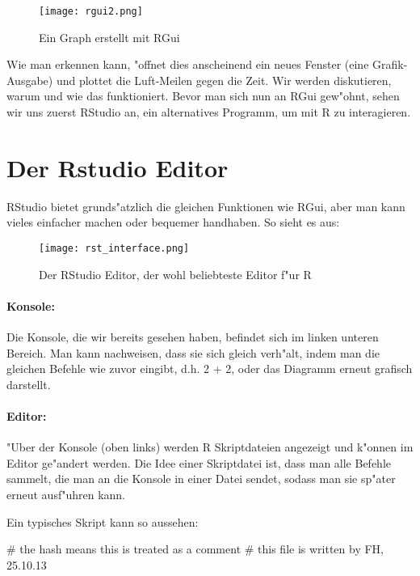 \documentclass[a4paper,twoside]{tufte-book}\usepackage[]{graphicx}\usepackage[]{color}
\begin{document}
\begin{appendices}
\begin{figure}[]
\begin{center}
\texttt{[image: rgui2.png]}
\caption{Ein Graph erstellt mit RGui}
\label{fig: Rgui2}
\end{center}
\end{figure}

Wie man erkennen kann, "offnet dies anscheinend ein neues Fenster (eine Grafik-Ausgabe) und plottet die Luft-Meilen gegen die Zeit. Wir werden diskutieren, warum und wie das funktioniert. Bevor man sich nun an RGui gew"ohnt, sehen wir uns zuerst RStudio an, ein alternatives Programm, um mit R zu interagieren.

\section{Der Rstudio Editor}
 
RStudio bietet grunds"atzlich die gleichen Funktionen wie RGui, aber man kann vieles einfacher machen oder bequemer handhaben. So sieht es aus:

\begin{figure}[]
\begin{center}
\texttt{[image: rst\_interface.png]}
\caption{Der RStudio Editor, der wohl beliebteste Editor f"ur R}
\label{fig: Rstudio}
\end{center}
\end{figure}


\paragraph{Konsole:} Die Konsole, die wir bereits gesehen haben, befindet sich im linken unteren Bereich. Man kann nachweisen, dass sie sich gleich verh"alt, indem man die gleichen Befehle wie zuvor eingibt, d.h. 2 + 2, oder das Diagramm erneut grafisch darstellt.

\paragraph{Editor:} "Uber der Konsole (oben links) werden R Skriptdateien angezeigt und k"onnen im Editor ge"andert werden. Die Idee einer Skriptdatei ist, dass man alle Befehle sammelt, die man an die Konsole in einer Datei sendet, sodass man sie sp"ater erneut ausf"uhren kann.  

Ein typisches Skript kann so aussehen:

\begin{Schunk}
\begin{Sinput}
# the hash means this is treated as a comment
# this file is written by FH, 25.10.13


\end{Sinput}
\end{Schunk}
\end{appendices}
\end{document}
